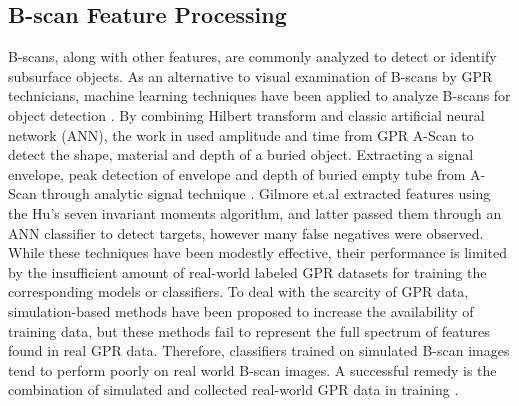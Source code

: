 \subsection{B-scan Feature Processing}
\hspace{0.5in}B-scans, along with other features, are commonly analyzed to detect or identify subsurface objects. As an alternative to visual examination of B-scans by GPR technicians, machine learning techniques have been applied to analyze B-scans for object detection \cite{Zhang2016UndergroundOC, 6576024, 7860619, DBLP, 6009168}. By combining Hilbert transform and classic artificial neural network (ANN), the work in \cite{Zhang2016UndergroundOC} used amplitude and time from GPR A-Scan to detect the shape, material and depth of a buried object. Extracting a signal envelope, peak detection of envelope and depth of buried empty tube from A-Scan through analytic signal technique \cite{8075631}. Gilmore et.al \cite{7860619} extracted features using the Hu's seven invariant moments algorithm, and latter passed them through an ANN classifier \cite{6576024} to detect targets, however many false negatives were observed. While these techniques have been modestly effective, their performance is limited by the insufficient amount of real-world labeled GPR datasets for training the corresponding models or classifiers. To deal with the scarcity of GPR data, simulation-based methods  have been proposed to increase the availability of training data, but these methods fail to represent the full spectrum of features found in real GPR data. Therefore, classifiers trained on simulated B-scan images tend to perform poorly on real world B-scan images. A successful remedy is the combination of simulated and collected real-world GPR data in training \cite{DBLP}.
\vspace{0.5\baselineskip}

